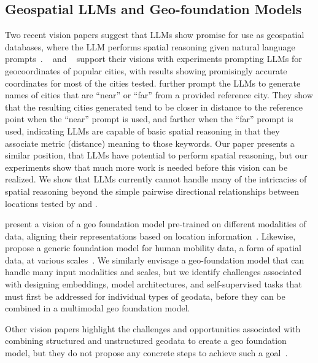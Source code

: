 \subsection{Geospatial LLMs and Geo-foundation Models}
Two recent vision papers suggest that LLMs show promise for use as geospatial databases, where the LLM performs spatial reasoning given natural language prompts~\cite{Bhandari2023, Qi2023}.
\citeauthor{Bhandari2023}~\cite{Bhandari2023} and \citeauthor{Qi2023}~\cite{Qi2023} support their visions with experiments prompting LLMs for geocoordinates of popular cities, with results showing promisingly accurate coordinates for most of the cities tested.
\citeauthor{Bhandari2023} further prompt the LLMs to generate names of cities that are ``near'' or ``far'' from a provided reference city.
They show that the resulting cities generated tend to be closer in distance to the reference point when the ``near'' prompt is used, and farther when the ``far'' prompt is used, indicating LLMs are capable of basic spatial reasoning in that they associate metric (distance) meaning to those keywords.
%
%
Our paper presents a similar position, that LLMs have potential to perform spatial reasoning, but our experiments show that much more work is needed before this vision can be realized.
We show that LLMs currently cannot handle many of the intricacies of spatial reasoning beyond the simple pairwise directional relationships between locations tested by \citeauthor{Bhandari2023} and \citeauthor{Qi2023}.

\citeauthor{Mai2023} present a vision of a geo foundation model pre-trained on different modalities of data, aligning their representations based on location information~\cite{Mai2023}.
Likewise, \citeauthor{Fei2022} propose a generic foundation model for human mobility data, a form of spatial data, at various scales~\cite{Fei2022}.
%
%
We similarly envisage a geo-foundation model that can handle many input modalities and scales, but we identify challenges associated with designing embeddings, model architectures, and self-supervised tasks that must first be addressed for individual types of geodata, before they can be combined in a multimodal geo foundation model.

Other vision papers highlight the challenges and opportunities associated with combining structured and unstructured geodata to create a geo foundation model, but they do not propose any concrete steps to achieve such a goal~\cite{Xie2023, Tan2023}.

